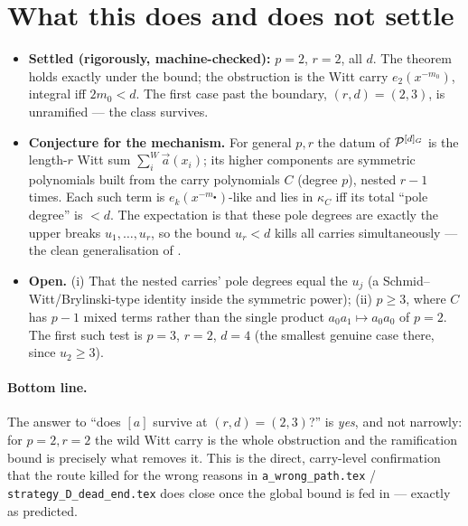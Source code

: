 \documentclass[11pt]{article}
\begin{document}
\section{What this does and does not settle}\label{sec:scope}
\begin{itemize}
  \item \textbf{Settled (rigorously, machine-checked):} $p=2$, $r=2$, all $d$.
        The theorem holds exactly under the bound; the obstruction is the Witt
        carry $e_2(x^{-m_0})$, integral iff $2m_0<d$. The first case past the
        boundary, $(r,d)=(2,3)$, is unramified --- the class survives.
  \item \textbf{Conjecture for the mechanism.} For general $p,r$ the datum of
        $\mathcal{P}^{[d]_G}$ is the length-$r$ Witt sum $\sum^W_i\vec a(x_i)$; its
        higher components are symmetric polynomials built from the carry
        polynomials $C$ (degree $p$), nested $r-1$ times. Each such term is
        $e_{k}(x^{-m_\bullet})$-like and lies in $\kappa_C$ iff its total
        ``pole degree'' is $<d$. The expectation is that these pole degrees are
        exactly the upper breaks $u_1,\dots,u_r$, so the bound $u_r<d$ kills all
        carries simultaneously --- the clean generalisation of .
  \item \textbf{Open.} (i) That the nested carries' pole degrees equal the
        $u_j$ (a Schmid--Witt/Brylinski-type identity inside the symmetric
        power); (ii) $p\ge3$, where $C$ has $p-1$ mixed terms rather than the
        single product $a_0a_1\mapsto a_0a_0$ of $p=2$. The first such test is
        $p=3$, $r=2$, $d=4$ (the smallest genuine case there, since $u_2\ge3$).
\end{itemize}

\paragraph{Bottom line.} The answer to ``does $[a]$ survive at $(r,d)=(2,3)$?''
is \emph{yes}, and not narrowly: for $p=2,r=2$ the wild Witt carry is the whole
obstruction and the ramification bound is precisely what removes it. This is the
direct, carry-level confirmation that the route killed for the wrong reasons in
\texttt{a\_wrong\_path.tex} / \texttt{strategy\_D\_dead\_end.tex} does close
once the global bound is fed in --- exactly as predicted.

\printbibliography
\end{document}
